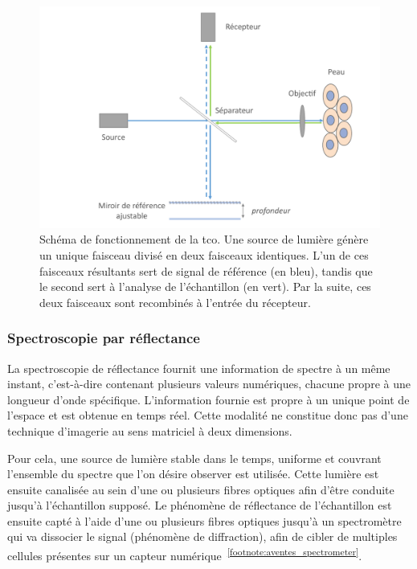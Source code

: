 \begin{figure}[H]
    \centering
    \includegraphics[width=1\linewidth]{contents/chapter_2/resources/scheme_principle_oct.pdf}
    \caption{Schéma de fonctionnement de la \gls{tco}. Une source de lumière génère un unique faisceau divisé en deux faisceaux identiques. L'un de ces faisceaux résultants sert de signal de référence (en bleu), tandis que le second sert à l'analyse de l'échantillon (en vert). Par la suite, ces deux faisceaux sont recombinés à l'entrée du récepteur.}
    \label{fig:scheme_principle_oct}
\end{figure}\par
\clearpage

\subsubsection{Spectroscopie par réflectance}
La spectroscopie de réflectance fournit une information de spectre à un même instant, c’est-à-dire contenant plusieurs valeurs numériques, chacune propre à une longueur d'onde spécifique. L'information fournie est propre à un unique point de l'espace et est obtenue en temps réel. Cette modalité ne constitue donc pas d'une technique d'imagerie au sens matriciel à deux dimensions.\par

Pour cela, une source de lumière stable dans le temps, uniforme et couvrant l'ensemble du spectre que l'on désire observer est utilisée. Cette lumière est ensuite canalisée au sein d'une ou plusieurs fibres optiques afin d'être conduite jusqu'à l'échantillon supposé. Le phénomène de réflectance de l'échantillon est ensuite capté à l'aide d'une ou plusieurs fibres optiques jusqu'à un spectromètre qui va dissocier le signal (phénomène de diffraction), afin de cibler de multiples cellules présentes sur un capteur numérique~\cite{Murphy2005,Mallia2008}\textsuperscript{\ref{footnote:aventes_spectrometer}}.\par

